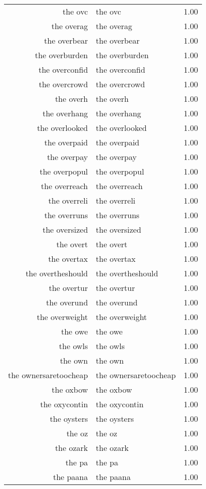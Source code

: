 \begin{table}[ht]
\begin{tabular}{rlr}
  the ovc & the ovc & 1.00 \\ 
  the overag & the overag & 1.00 \\ 
  the overbear & the overbear & 1.00 \\ 
  the overburden & the overburden & 1.00 \\ 
  the overconfid & the overconfid & 1.00 \\ 
  the overcrowd & the overcrowd & 1.00 \\ 
  the overh & the overh & 1.00 \\ 
  the overhang & the overhang & 1.00 \\ 
  the overlooked & the overlooked & 1.00 \\ 
  the overpaid & the overpaid & 1.00 \\ 
  the overpay & the overpay & 1.00 \\ 
  the overpopul & the overpopul & 1.00 \\ 
  the overreach & the overreach & 1.00 \\ 
  the overreli & the overreli & 1.00 \\ 
  the overruns & the overruns & 1.00 \\ 
  the oversized & the oversized & 1.00 \\ 
  the overt & the overt & 1.00 \\ 
  the overtax & the overtax & 1.00 \\ 
  the overtheshould & the overtheshould & 1.00 \\ 
  the overtur & the overtur & 1.00 \\ 
  the overund & the overund & 1.00 \\ 
  the overweight & the overweight & 1.00 \\ 
  the owe & the owe & 1.00 \\ 
  the owls & the owls & 1.00 \\ 
  the own & the own & 1.00 \\ 
  the ownersaretoocheap & the ownersaretoocheap & 1.00 \\ 
  the oxbow & the oxbow & 1.00 \\ 
  the oxycontin & the oxycontin & 1.00 \\ 
  the oysters & the oysters & 1.00 \\ 
  the oz & the oz & 1.00 \\ 
  the ozark & the ozark & 1.00 \\ 
  the pa & the pa & 1.00 \\ 
  the paana & the paana & 1.00 \\ 

\end{tabular}
\end{table}
